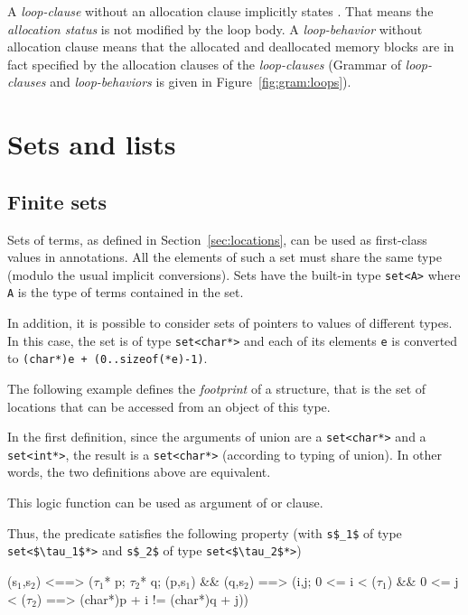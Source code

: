 A {\sl loop-clause} without an allocation clause implicitly states \Loop \allocates \nothing.
That means the {\sl allocation status} is not modified by the loop body.
A {\sl loop-behavior} without allocation clause means that  
the allocated and deallocated memory blocks are in fact specified by the allocation clauses
of the {\sl loop-clauses}
(Grammar of {\sl loop-clauses} and {\sl loop-behaviors} is given in Figure~\ref{fig:gram:loops}).

\section{Sets and lists}

\subsection{Finite sets}\label{sec:sets}
Sets of terms, as defined in Section~\ref{sec:locations},
can be used as first-class values in
annotations. All the elements of such a set must share the same type
(modulo the usual implicit conversions).
Sets have the built-in type \lstinline|set<A>|
where \lstinline|A| is the type of terms contained in the set.

In addition, it is possible to consider sets of pointers to values of
different types. In this case, the set is of type
\lstinline|set<char*>| and
each of its elements \lstinline|e| is converted to
\lstinline|(char*)e + (0..sizeof(*e)-1)|.

\begin{example}
  The following example defines the \emph{footprint} of a
  structure, that is the set of locations that can be accessed from an
  object of this type.


  In the first definition, since the arguments of union are a
  \lstinline|set<char*>| and a \lstinline|set<int*>|,
  the result is a \lstinline|set<char*>| (according to typing of union). In
  other words, the two definitions above are equivalent.

  This logic function can be used as argument of \separated or
  \assigns clause.
\end{example}

Thus, the \separated predicate satisfies the following property (with
\lstinline|s$_1$| of type \lstinline|set<$\tau_1$*>| and \lstinline|s$_2$| of type
\lstinline|set<$\tau_2$*>|)
\begin{listing}{1}
\separated(s$_1$,s$_2$) <==>
  (\forall $\tau_1$* p; \forall $\tau_2$* q;
     \subset(p,s$_1$) && \subset(q,s$_2$) ==>
       (\forall \integer i,j;
         0 <= i < \sizeof($\tau_1$) && 0 <= j < \sizeof($\tau_2$) ==>
           (char*)p + i != (char*)q + j))
\end{listing}

